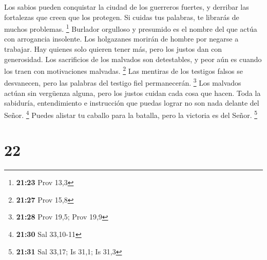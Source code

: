  Los sabios pueden conquistar la ciudad de los guerreros
fuertes, y derribar las fortalezas que creen que los protegen.
 Si cuidas tus palabras, te librarás de muchos problemas.
\footnote{\textbf{21:23} Prov 13,3}  Burlador orgulloso y
presumido es el nombre del que actúa con arrogancia insolente.
 Los holgazanes morirán de hombre por negarse a trabajar.
 Hay quienes solo quieren tener más, pero los justos dan
con generosidad.  Los sacrificios de los malvados son
detestables, y peor aún es cuando los traen con motivaciones malvadas.
\footnote{\textbf{21:27} Prov 15,8}  Las mentiras de los
testigos falsos se desvanecen, pero las palabras del testigo fiel
permanecerán. \footnote{\textbf{21:28} Prov 19,5; Prov 19,9}
 Los malvados actúan sin vergüenza alguna, pero los justos
cuidan cada cosa que hacen.  Toda la sabiduría,
entendimiento e instrucción que puedas lograr no son nada delante del
Señor. \footnote{\textbf{21:30} Sal 33,10-11}  Puedes
alistar tu caballo para la batalla, pero la victoria es del Señor.
\footnote{\textbf{21:31} Sal 33,17; Is 31,1; Is 31,3}

\hypertarget{section-21}{%
\section{22}\label{section-21}}


